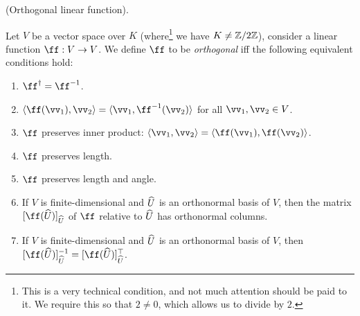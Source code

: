 \begin{defn}
\label{ch::bilinear_forms_metric_tensors::defn::orthogonal_linear_fn}
    (Orthogonal linear function). 
    
    Let $V$ be a vector space over $K$ (where\footnote{This is a very technical condition, and not much attention should be paid to it. We require this so that $2 \neq 0$, which allows us to divide by $2$.} we have $K \neq \mathbb{Z}/2\mathbb{Z}$), consider a linear function $\ff:V \rightarrow V$. We define $\ff$ to be \textit{orthogonal} iff the following equivalent conditions hold:
    
    \begin{enumerate}
        \item $\ff^\dag = \ff^{-1}$.
        \item $\langle \ff(\vv_1), \vv_2 \rangle = \langle \vv_1, \ff^{-1}(\vv_2) \rangle$ for all $\vv_1, \vv_2 \in V$.
        \item $\ff$ preserves inner product: $\langle \vv_1, \vv_2 \rangle = \langle \ff(\vv_1), \ff(\vv_2) \rangle$.
        \item $\ff$ preserves length.
        \item $\ff$ preserves length and angle.
        \item If $V$ is finite-dimensional and $\widehat{U}$ is an orthonormal basis of $V$, then the matrix $[\ff(\hU)]_{\hU}$ of $\ff$ relative to $\widehat{U}$ has orthonormal columns.
        \item If $V$ is finite-dimensional and $\widehat{U}$ is an orthonormal basis of $V$, then $[\ff(\hU)]_{\hU}^{-1} = [\ff(\hU)]_{\hU}^{\top}$.
    \end{enumerate}
\end{defn}
        
